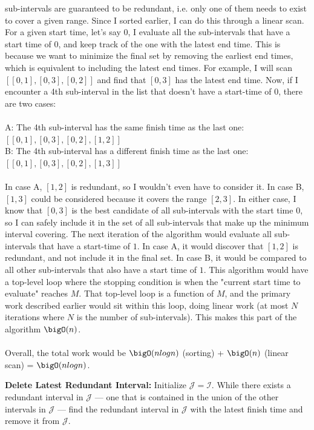 \documentclass{hw_template}
\begin{document}
\begin{problem}
\begin{solution}
sub-intervals are guaranteed to be redundant, i.e. only one of them needs to exist to cover a given range. Since I sorted earlier, I can do this through 
a linear scan. For a given start time, let's say $0$, I evaluate all the sub-intervals that have a start time of $0$, and keep track of the one with the 
latest end time. This is because we want to minimize the final set by removing the earliest end times, which is equivalent to including the 
latest end times. For example, I will scan $[[0,1], [0,3], [0,2]]$ and find that $[0,3]$ has the latest end time. Now, if I encounter a 4th sub-interval 
in the list that doesn't have a start-time of $0$, there are two cases:\\\\
A: The 4th sub-interval has the same finish time as the last one: $[[0,1], [0,3], [0,2], [1,2]]$\\
B: The 4th sub-interval has a different finish time as the last one: $[[0,1], [0,3], [0,2], [1,3]]$\\\\
In case A, $[1,2]$ is redundant, so I wouldn't even have to consider it.
In case B, $[1,3]$ could be considered because it covers the range $[2,3]$.
In either case, I know that $[0,3]$ is the best candidate of all sub-intervals with the start time $0$, so I can safely include it in the set 
of all sub-intervals that make up the minimum interval covering. The next iteration of the algorithm would evaluate all sub-intervals that have a 
start-time of $1$. In case A, it would discover that $[1,2]$ is redundant, and not include it in the final set. In case B, it would be compared to 
all other sub-intervals that also have a start time of $1$. This algorithm would have a top-level loop where the stopping condition is when the "current 
start time to evaluate" reaches $M$. That top-level loop is a function of $M$, and the primary work described earlier would sit within this loop, doing 
linear work (at most $N$ iterations where $N$ is the number of sub-intervals). This makes this part of the algorithm $\bigO(n)$.\\\\
Overall, the total work would be $\bigO(nlogn)$ (sorting) + $\bigO(n)$ (linear scan) = $\bigO(nlogn)$.
\end{solution}

\begin{subproblem}
    \textbf{Delete Latest Redundant Interval:}
  Initialize $\mathcal{J}=\mathcal{I}$. While there
  exists a redundant interval in $\mathcal{J}$ --- one
  that is contained in the union of the other intervals
  in $\mathcal{J}$ --- find the redundant interval in
  $\mathcal{J}$ with the latest finish time and remove it
  from $\mathcal{J}$.
\end{subproblem}


\end{problem}
\end{document}
